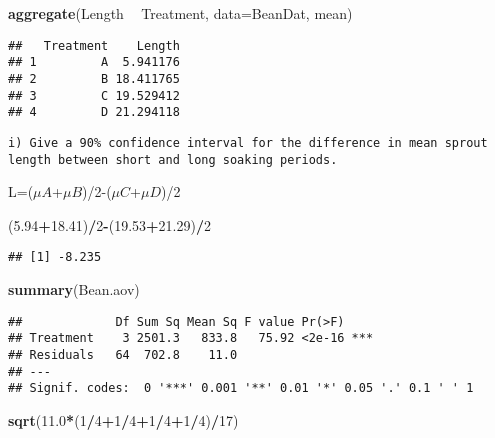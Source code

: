 \documentclass[]{article}
\newenvironment{Shaded}{\begin{snugshade}}{\end{snugshade}}
\newcommand{\KeywordTok}[1]{\textcolor[rgb]{0.13,0.29,0.53}{\textbf{#1}}}
\newcommand{\DataTypeTok}[1]{\textcolor[rgb]{0.13,0.29,0.53}{#1}}
\newcommand{\DecValTok}[1]{\textcolor[rgb]{0.00,0.00,0.81}{#1}}
\newcommand{\FloatTok}[1]{\textcolor[rgb]{0.00,0.00,0.81}{#1}}
\newcommand{\StringTok}[1]{\textcolor[rgb]{0.31,0.60,0.02}{#1}}
\newcommand{\OperatorTok}[1]{\textcolor[rgb]{0.81,0.36,0.00}{\textbf{#1}}}
\newcommand{\NormalTok}[1]{#1}
\begin{document}
\begin{Shaded}
\begin{Highlighting}[]
\KeywordTok{aggregate}\NormalTok{(Length }\OperatorTok{~}\StringTok{ }\NormalTok{Treatment, }\DataTypeTok{data=}\NormalTok{BeanDat, mean)}
\end{Highlighting}
\end{Shaded}

\begin{verbatim}
##   Treatment    Length
## 1         A  5.941176
## 2         B 18.411765
## 3         C 19.529412
## 4         D 21.294118
\end{verbatim}

\begin{verbatim}
i) Give a 90% confidence interval for the difference in mean sprout length between short and long soaking periods. 
\end{verbatim}

L=(\(\mu{A}\)+\(\mu{B}\))/2-(\(\mu{C}\)+\(\mu{D}\))/2

\begin{Shaded}
\begin{Highlighting}[]
\NormalTok{(}\FloatTok{5.94}\OperatorTok{+}\FloatTok{18.41}\NormalTok{)}\OperatorTok{/}\DecValTok{2}\OperatorTok{-}\NormalTok{(}\FloatTok{19.53}\OperatorTok{+}\FloatTok{21.29}\NormalTok{)}\OperatorTok{/}\DecValTok{2}
\end{Highlighting}
\end{Shaded}

\begin{verbatim}
## [1] -8.235
\end{verbatim}

\begin{Shaded}
\begin{Highlighting}[]
\KeywordTok{summary}\NormalTok{(Bean.aov)}
\end{Highlighting}
\end{Shaded}

\begin{verbatim}
##             Df Sum Sq Mean Sq F value Pr(>F)    
## Treatment    3 2501.3   833.8   75.92 <2e-16 ***
## Residuals   64  702.8    11.0                   
## ---
## Signif. codes:  0 '***' 0.001 '**' 0.01 '*' 0.05 '.' 0.1 ' ' 1
\end{verbatim}

\begin{Shaded}
\begin{Highlighting}[]
\KeywordTok{sqrt}\NormalTok{(}\FloatTok{11.0}\OperatorTok{*}\NormalTok{(}\DecValTok{1}\OperatorTok{/}\DecValTok{4}\OperatorTok{+}\DecValTok{1}\OperatorTok{/}\DecValTok{4}\OperatorTok{+}\DecValTok{1}\OperatorTok{/}\DecValTok{4}\OperatorTok{+}\DecValTok{1}\OperatorTok{/}\DecValTok{4}\NormalTok{)}\OperatorTok{/}\DecValTok{17}\NormalTok{)}
\end{Highlighting}
\end{Shaded}
\end{document}
